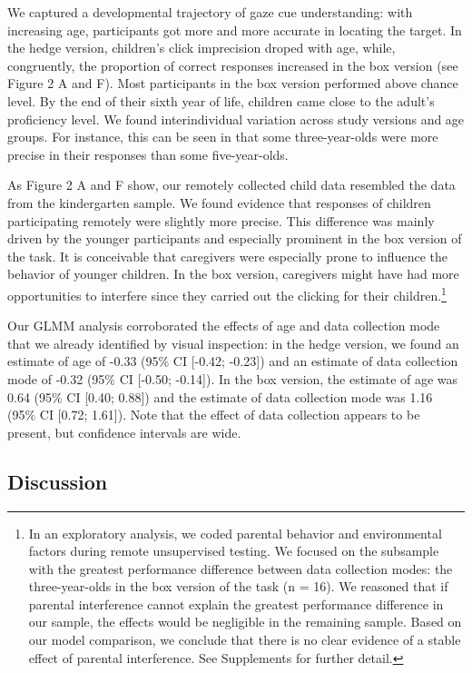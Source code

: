 \documentclass[
  man,floatsintext]{apa6}
\begin{document}
We captured a developmental trajectory of gaze cue understanding: with increasing age, participants got more and more accurate in locating the target. In the hedge version, children's click imprecision droped with age, while, congruently, the proportion of correct responses increased in the box version (see Figure 2 A and F). Most participants in the box version performed above chance level. By the end of their sixth year of life, children came close to the adult's proficiency level. We found interindividual variation across study versions and age groups. For instance, this can be seen in that some three-year-olds were more precise in their responses than some five-year-olds.

As Figure 2 A and F show, our remotely collected child data resembled the data from the kindergarten sample.
We found evidence that responses of children participating remotely were slightly more precise. This difference was mainly driven by the younger participants and especially prominent in the box version of the task. It is conceivable that caregivers were especially prone to influence the behavior of younger children. In the box version, caregivers might have had more opportunities to interfere since they carried out the clicking for their children.\footnote{In an exploratory analysis, we coded parental behavior and environmental factors during remote unsupervised testing. We focused on the subsample with the greatest performance difference between data collection modes: the three-year-olds in the box version of the task (n = 16). We reasoned that if parental interference cannot explain the greatest performance difference in our sample, the effects would be negligible in the remaining sample. Based on our model comparison, we conclude that there is no clear evidence of a stable effect of parental interference. See Supplements for further detail.}

Our GLMM analysis corroborated the effects of age and data collection mode that we already identified by visual inspection: in the hedge version, we found an estimate of age of -0.33 (95\% CI {[}-0.42; -0.23{]}) and an estimate of data collection mode of -0.32 (95\% CI {[}-0.50; -0.14{]}).
In the box version, the estimate of age was 0.64 (95\% CI {[}0.40; 0.88{]}) and the estimate of data collection mode was 1.16 (95\% CI {[}0.72; 1.61{]}). Note that the effect of data collection appears to be present, but confidence intervals are wide.

\hypertarget{discussion}{%
\subsection{Discussion}\label{discussion}}
\end{document}
